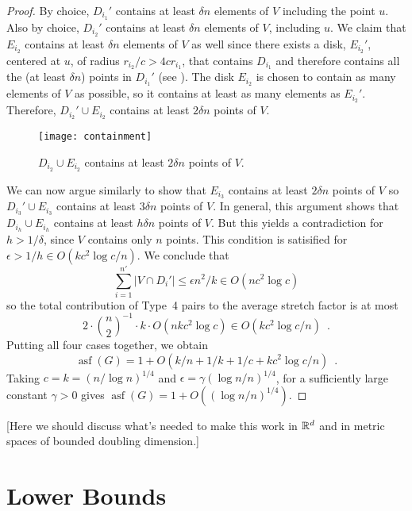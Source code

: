 \documentclass{patmorin}
\DeclareMathOperator{\asf}{asf}
\begin{document}
\begin{proof}
  By choice, $D_{i_1}'$ contains at least $\delta n$ elements of $V$
  including the point $u$.  Also by choice, $D_{i_2}'$ contains at least
  $\delta n$ elements of $V$, including $u$.  We claim that $E_{i_2}$
  contains at least $\delta n$ elements of $V$ as well since there
  exists a disk, $E_{i_2}'$, centered at $u$, of radius $r_{i_2}/c >
  4cr_{i_1}$, that contains $D_{i_1}$ and therefore contains all the
  (at least $\delta n$) points in $D_{i_1}'$ (see ).
  The disk $E_{i_2}$ is chosen to contain as many elements of $V$ as
  possible, so it contains at least as many elements as $E_{i_2}'$.
  Therefore, $D_{i_2}'\cup E_{i_2}$ contains at least $2\delta n$
  points of $V$.

  \begin{figure}
     \begin{center}
       \texttt{[image: containment]}
     \end{center}
     \caption{$D_{i_2}\cup E_{i_2}$ contains at least $2\delta n$ 
              points of $V$.}
   \end{figure}

  We can now argue similarly to show that $E_{i_3}$ contains at least
  $2\delta n$ points of $V$ so $D_{i_3}'\cup E_{i_3}$ contains at least
  $3\delta n$ points of $V$.  In general, this argument shows that
  $D_{i_h}\cup E_{i_h}$ contains at least $h\delta n$ points of $V$.
  But this yields a contradiction for $h> 1/\delta$, since $V$
  contains only $n$ points.  This condition is satisified for $\epsilon > 1/h \in O(kc^2\log c/n)$. We conclude that 
  \[
    \sum_{i=1}^{n'}|V\cap D_i'| 
       \le \epsilon n^2/k  \in O(nc^2\log c)
  \]
  so the total contribution of Type~4 pairs to the average stretch factor
  is at most
  \[
    2\cdot\binom{n}{2}^{-1}\cdot k\cdot O(nkc^2\log c) \in O(kc^2\log c/n) \enspace .
  \]
  Putting all four cases together, we obtain
  \[
     \asf(G) = 1 + O(k/n + 1/k + 1/c + kc^2\log c/n) \enspace .
  \]
  Taking $c=k=(n/\log n)^{1/4}$ and $\epsilon = \gamma (\log n/n)^{1/4}$,
  for a sufficiently large constant $\gamma >0$ gives $\asf(G)=1+O((\log
  n/n)^{1/4})$.
\end{proof}

[Here we should discuss what's needed to make this work in $\mathbb{R}^d$ and in
metric spaces of bounded doubling dimension.]


\section{Lower Bounds}
\end{document}

